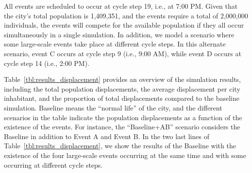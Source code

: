 \documentclass[pdflatex,sn-mathphys-num]{sn-jnl}%
\theoremstyle{thmstyleone}%
\theoremstyle{thmstyletwo}%
\theoremstyle{thmstylethree}%
\begin{document}
All events are scheduled to occur at cycle step 19, i.e., at 7:00 PM. Given that the city's total population is 1,409,351, and the events require a total of 2,000,000 individuals, the events will compete for the available population if they all occur simultaneously in a single simulation.
In addition, we model a scenario where some large-scale events take place at different cycle steps. In this alternate scenario, event C occurs at cycle step 9 (i.e., 9:00 AM), while event D occurs at cycle step 14 (i.e., 2:00 PM).

Table~\ref{tbl:results_displacement} provides an overview of the simulation results, including the total population displacements, the average displacement per city inhabitant, and the proportion of total displacements compared to the baseline simulation. Baseline means the ``normal life'' of the city, and the different scenarios in the table indicate the population displacements as a function of the existence of the events. For instance, the ``Baseline+AB'' scenario considers the Baseline in addition to Event A and Event B. In the two last lines of Table~\ref{tbl:results_displacement}, we show the results of the Baseline with the existence of the four large-scale events occurring at the same time and with some occurring at different cycle steps.
\end{document}
